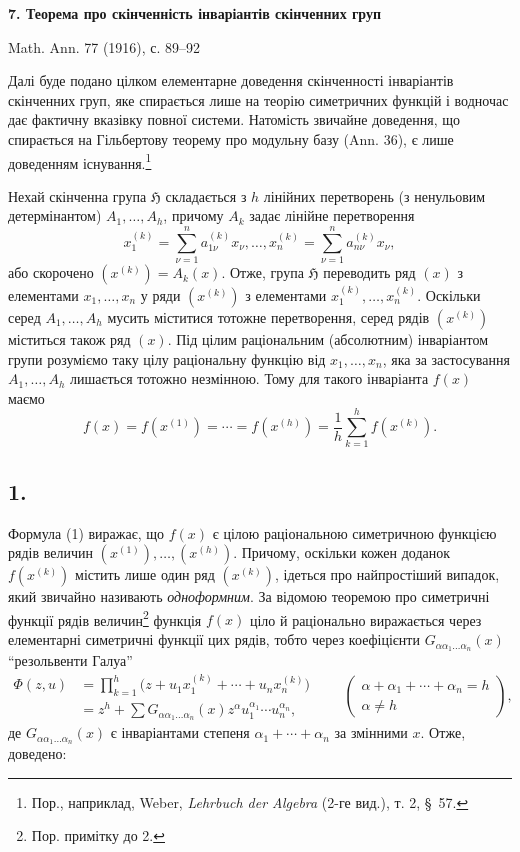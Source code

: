 \documentclass[11pt]{article}
\providecommand{\Hgrp}{\mathfrak{H}}
\begin{document}
\begin{center}
{\Large\bfseries 7. Теорема про скінченність інваріантів скінченних груп}\par
\vspace{1.2em}
Math. Ann. 77 (1916), с. 89--92
\end{center}

\vspace{1em}

Далі буде подано цілком елементарне доведення скінченності інваріантів скінченних груп, яке спирається лише на теорію симетричних функцій і водночас дає фактичну вказівку повної системи. Натомість звичайне доведення, що спирається на Гільбертову теорему про модульну базу (Ann. 36), є лише доведенням існування.\footnote{Пор., наприклад, Weber, \emph{Lehrbuch der Algebra} (2-ге вид.), т. 2, \S\ 57.}

Нехай скінченна група $\Hgrp$ складається з $h$ лінійних перетворень (з ненульовим детермінантом) $A_1,\ldots,A_h$, причому $A_k$ задає лінійне перетворення
\[
  x_1^{(k)}=\sum_{\nu=1}^{n}a_{1\nu}^{(k)}x_\nu,\ldots,
  x_n^{(k)}=\sum_{\nu=1}^{n}a_{n\nu}^{(k)}x_\nu,
\]
або скорочено $(x^{(k)})=A_k(x)$. Отже, група $\Hgrp$ переводить ряд $(x)$ з елементами $x_1,\ldots,x_n$ у ряди $(x^{(k)})$ з елементами $x_1^{(k)},\ldots,x_n^{(k)}$. Оскільки серед $A_1,\ldots,A_h$ мусить міститися тотожне перетворення, серед рядів $(x^{(k)})$ міститься також ряд $(x)$. Під цілим раціональним (абсолютним) інваріантом групи розуміємо таку цілу раціональну функцію від $x_1,\ldots,x_n$, яка за застосування $A_1,\ldots,A_h$ лишається тотожно незмінною. Тому для такого інваріанта $f(x)$ маємо
\begin{equation}
  f(x)=f(x^{(1)})=\cdots=f(x^{(h)})=
  \frac1h\sum_{k=1}^{h}f(x^{(k)}).
\tag{1}
\end{equation}

\subsection*{1.}
Формула (1) виражає, що $f(x)$ є цілою раціональною симетричною функцією рядів величин $(x^{(1)}),\ldots,(x^{(h)})$. Причому, оскільки кожен доданок $f(x^{(k)})$ містить лише один ряд $(x^{(k)})$, ідеться про найпростіший випадок, який звичайно називають \emph{одноформним}. За відомою теоремою про симетричні функції рядів величин\footnote{Пор. примітку до 2.} функція $f(x)$ ціло й раціонально виражається через елементарні симетричні функції цих рядів, тобто через коефіцієнти $G_{\alpha\alpha_1\ldots\alpha_n}(x)$ ``резольвенти Галуа''
\[
\begin{aligned}
  \Phi(z,u)
  &=\prod_{k=1}^{h}\bigl(z+u_1x_1^{(k)}+\cdots+u_nx_n^{(k)}\bigr) \\
  &=z^h+
    \sum G_{\alpha\alpha_1\ldots\alpha_n}(x)
    z^{\alpha}u_1^{\alpha_1}\cdots u_n^{\alpha_n},
\end{aligned}
\qquad
\left(\begin{array}{c}
\alpha+\alpha_1+\cdots+\alpha_n=h\\
\alpha\ne h
\end{array}\right),
\]
де $G_{\alpha\alpha_1\ldots\alpha_n}(x)$ є інваріантами степеня $\alpha_1+\cdots+\alpha_n$ за змінними $x$. Отже, доведено:
\end{document}
